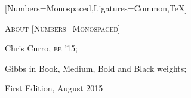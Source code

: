 \documentclass{article}
\begin{document}
\begin{minipage}[t]{0.46\linewidth}
[Numbers=Monospaced,Ligatures={Common,TeX}]
\fontsize{9.5pt}{9.5pt}\selectfont
\upshape
\raggedright
\nocite{*}


\scshape \fontsize{16pt}{16pt}\selectfont {} About
[Numbers=Monospaced]
\fontsize{10pt}{10pt}\selectfont
\upshape
\raggedright

\begin{description}
\itemsep1pt
\item[Contributors:] Chris Curro, {\scshape ee '15}; 
\item[Typefaces:] Gibbs in Book, Medium, Bold and Black weights;
\item[Printing:] First Edition, August 2015
\end{description}
\end{minipage}
\end{document}
